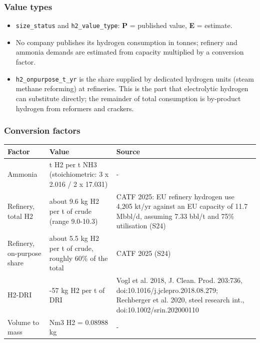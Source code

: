 \documentclass[11pt,a4paper]{article}
\begin{document}
\subsubsection{Value types}

\begin{itemize}\setlength\itemsep{1pt}

  \item \texttt{size\_status} and \texttt{h2\_value\_type}: \textbf{P} = published value, \textbf{E} = estimate.

  \item No company publishes its hydrogen consumption in tonnes; refinery and ammonia demands are estimated from capacity multiplied by a conversion factor.

  \item \texttt{h2\_onpurpose\_t\_yr} is the share supplied by dedicated hydrogen units (steam methane reforming) at refineries. This is the part that electrolytic hydrogen can substitute directly; the remainder of total consumption is by-product hydrogen from reformers and crackers.

\end{itemize}

\subsubsection{Conversion factors}

\begin{center}\footnotesize
\begin{tabularx}{\textwidth}{>{\hsize=0.450\hsize\raggedright\arraybackslash}X>{\hsize=0.749\hsize\raggedright\arraybackslash}X>{\hsize=1.801\hsize\raggedright\arraybackslash}X}
\toprule
\textbf{Factor} & \textbf{Value} & \textbf{Source} \\
\midrule
Ammonia & 0.1776 t H2 per t NH3 (stoichiometric: 3 x 2.016 /\allowbreak{} 2 x 17.031) & - \\
Refinery, total H2 & about 9.6 kg H2 per t of crude (range 9.0-10.3) & CATF 2025: EU refinery hydrogen use 4,205 kt/\allowbreak{}yr against an EU capacity of 11.7 Mbbl/\allowbreak{}d, assuming 7.33 bbl/\allowbreak{}t and 75\% utilisation (S24) \\
Refinery, on-purpose share & about 5.5 kg H2 per t of crude, roughly 60\% of the total & CATF 2025 (S24) \\
H2-DRI & 47-57 kg H2 per t of DRI & Vogl et al. 2018, J. Clean. Prod. 203:736, doi:10.1016/\allowbreak{}j.jclepro.2018.08.279; Rechberger et al. 2020, steel research int., doi:10.1002/\allowbreak{}srin.202000110 \\
Volume to mass & 1 Nm3 H2 = 0.08988 kg & - \\
\bottomrule
\end{tabularx}
\end{center}
\end{document}
